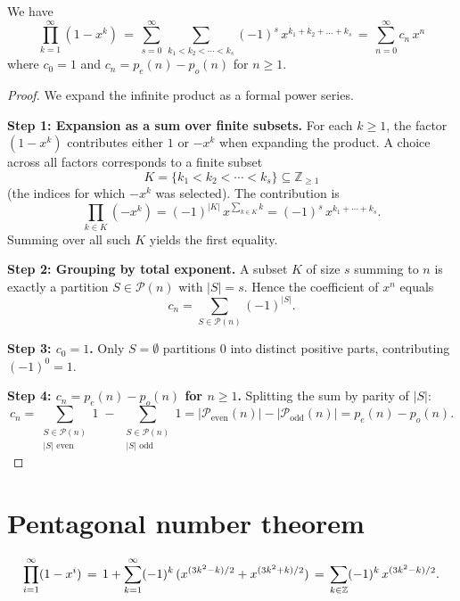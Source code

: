 \begin{lemma}\label{lemma:expansion-product}\leanok{}
We have
$$\prod_{k=1}^{\infty}(1-x^k)\,=\,\sum_{s=0}^\infty\,\sum_{k_1<k_2<\cdots<k_s}(-1)^s\,x^{k_1+k_2+\ldots+k_s}\,=\,\sum_{n=0}^\infty c_n\, x^n$$
where $c_0=1$ and $c_n=p_e(n)-p_o(n)$ for $n\geq 1$.
\end{lemma}
\begin{proof}\leanok
We expand the infinite product as a formal power series.

\textbf{Step 1: Expansion as a sum over finite subsets.}
For each $k \geq 1$, the factor $(1 - x^k)$ contributes either $1$ or $-x^k$ when expanding the product. A choice across all factors corresponds to a finite subset
$$K = \{k_1 < k_2 < \cdots < k_s\} \subseteq \mathbb{Z}_{\geq 1}$$
(the indices for which $-x^k$ was selected). The contribution is
$$\prod_{k \in K} (-x^k) = (-1)^{|K|}\, x^{\sum_{k \in K} k} = (-1)^s \, x^{k_1 + \cdots + k_s}.$$
Summing over all such $K$ yields the first equality.

\textbf{Step 2: Grouping by total exponent.}
A subset $K$ of size $s$ summing to $n$ is exactly a partition $S \in \mathcal{P}(n)$ with $|S| = s$. Hence the coefficient of $x^n$ equals
$$c_n = \sum_{S \in \mathcal{P}(n)} (-1)^{|S|}.$$

\textbf{Step 3: $c_0 = 1$.}
Only $S = \emptyset$ partitions $0$ into distinct positive parts, contributing $(-1)^0 = 1$.

\textbf{Step 4: $c_n = p_e(n) - p_o(n)$ for $n \geq 1$.}
Splitting the sum by parity of $|S|$:
$$c_n = \sum_{\substack{S \in \mathcal{P}(n) \\ |S| \text{ even}}} 1 \;-\; \sum_{\substack{S \in \mathcal{P}(n) \\ |S| \text{ odd}}} 1 = |\mathcal{P}_{\mathrm{even}}(n)| - |\mathcal{P}_{\mathrm{odd}}(n)| = p_e(n) - p_o(n).$$
\end{proof}

\section{Pentagonal number theorem}

\begin{theorem}[Euler]\label{thm:euler-pentagonal}\leanok{}
$$\prod_{i=1}^\infty(1-x^i)\,=\,1+\sum_{k=1}^\infty (-1)^k\,(x^{(3k^2-k)/2}+x^{(3k^2+k)/2})\,=\,
\sum_{k\in\mathbb{Z}}(-1)^k\,x^{(3k^2-k)/2}.$$
\end{theorem}

